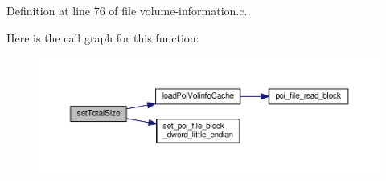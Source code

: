 Definition at line 76 of file volume-\/information.\-c.



Here is the call graph for this function\-:
\nopagebreak
\begin{figure}[H]
\begin{center}
\leavevmode
\includegraphics[width=350pt]{volume-information_8h_a6a0ecaeeea8bd2cbfc8c261d9c53d912_cgraph}
\end{center}
\end{figure}


